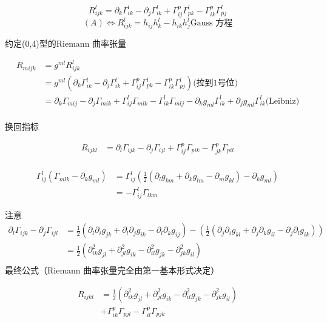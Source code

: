 \documentclass[lang=cn,10pt,thmcnt=section]{elegantbook}
\begin{document}
\begin{definition}
    \[
    R_{ijk}^l=\partial_{k} \Gamma_{ik}^l-\partial_{j} \Gamma_{ik}^l+\Gamma_{ij}^p\Gamma_{pk}^l-\Gamma_{ik}^p\Gamma_{pj}^l
    \]
    \[
    (A)\Leftrightarrow R_{ijk}^l=h_{ij}h^l_k-h_{ik}h^l_j\text{Gauss 方程}
    \]
\end{definition}
约定(0,4)型的Riemann 曲率张量

\begin{align*}
    R_{mijk}&=g^{ml}R_{ijk}^l\\
    &=g^{ml}(\partial_{k} \Gamma_{ik}^l-\partial_{j} \Gamma_{ik}^l+\Gamma_{ij}^p\Gamma_{pk}^l-\Gamma_{ik}^p\Gamma_{pj}^l)\text{(拉到1号位)}\\
    &=\partial_k\Gamma_{mij}-\partial_j\Gamma_{mik}+\Gamma_{ij}^l\Gamma_{mlk}-\Gamma_{ik}^l\Gamma_{mlj}-\partial_k g_{ml} \Gamma_{ik}^l+\partial_jg_{ml}\Gamma_{ik}^l\text{(Leibniz)}\\
\end{align*}

换回指标

\begin{align*}
    R_{ijkl}&=\partial_l\Gamma_{ijk}-\partial_j\Gamma_{ijl}+\Gamma_{ij}^p\Gamma_{pik}-\Gamma_{jk}^p\Gamma_{pil}\\
\end{align*}

\begin{align*}
    \Gamma_{ij}^l(\Gamma_{mlk}-\partial_kg_{ml})&=\Gamma_{ij}^l(\frac{1}{2}(\partial_lg_{km}+\partial_kg_{lm}-\partial_mg_{kl})-\partial_kg_{ml})\\
    &= -\Gamma_{ij}^l \Gamma_{lkm}
\end{align*}

注意
\begin{align*}
    \partial_l\Gamma_{ijk}-\partial_j\Gamma_{ijl}&=\frac{1}{2}(\partial_l\partial_ig_{jk}+\partial_l\partial_jg_{ik}-\partial_l\partial_kg_{ij})-(\frac{1}{2}(\partial_j\partial_ig_{kl}+\partial_j\partial_kg_{il}-\partial_j\partial_lg_{ik}))\\
    &=\frac{1}{2}(\partial^2_{ik}g_{jl}+\partial^2_{jl}g_{ik}-\partial^2_{il}g_{jk}-\partial^2_{jk}g_{il})\\
\end{align*}
最终公式（Riemann 曲率张量完全由第一基本形式决定）

\begin{align*}
    R_{ijkl}&=\frac{1}{2}(\partial^2_{ik}g_{jl}+\partial^2_{jl}g_{ik}-\partial^2_{il}g_{jk}-\partial^2_{jk}g_{il})\\
    &+ \Gamma_{ik}^p\Gamma_{pjl}-\Gamma_{il}^p\Gamma_{pjk}
\end{align*}
\end{document}

